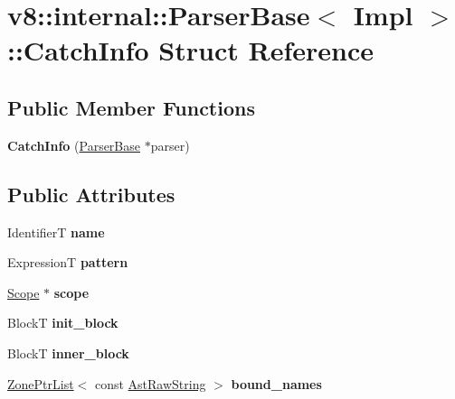\hypertarget{structv8_1_1internal_1_1ParserBase_1_1CatchInfo}{}\section{v8\+:\+:internal\+:\+:Parser\+Base$<$ Impl $>$\+:\+:Catch\+Info Struct Reference}
\label{structv8_1_1internal_1_1ParserBase_1_1CatchInfo}
\subsection*{Public Member Functions}
\begin{DoxyCompactItemize}
\item 
\mbox{\label{structv8_1_1internal_1_1ParserBase_1_1CatchInfo_afb8d993402582c10a5879d2c73afaebc}} 
{\bfseries Catch\+Info} (\mbox{\hyperlink{classv8_1_1internal_1_1ParserBase}{Parser\+Base}} $\ast$parser)
\end{DoxyCompactItemize}
\subsection*{Public Attributes}
\begin{DoxyCompactItemize}
\item 
\mbox{\label{structv8_1_1internal_1_1ParserBase_1_1CatchInfo_a7bf8d2ca51ca18cdbe1d92dfb7345d68}} 
IdentifierT {\bfseries name}
\item 
\mbox{\label{structv8_1_1internal_1_1ParserBase_1_1CatchInfo_aad4ae07c86da474233e3474970623a17}} 
ExpressionT {\bfseries pattern}
\item 
\mbox{\label{structv8_1_1internal_1_1ParserBase_1_1CatchInfo_a768916ef0babd2723b87390c60604dc1}} 
\mbox{\hyperlink{classv8_1_1internal_1_1Scope}{Scope}} $\ast$ {\bfseries scope}
\item 
\mbox{\label{structv8_1_1internal_1_1ParserBase_1_1CatchInfo_ad7573933e3ca68313493ca1d893b07b6}} 
BlockT {\bfseries init\+\_\+block}
\item 
\mbox{\label{structv8_1_1internal_1_1ParserBase_1_1CatchInfo_ad1605d157a6cb8d6ab8e13b22b721792}} 
BlockT {\bfseries inner\+\_\+block}
\item 
\mbox{\label{structv8_1_1internal_1_1ParserBase_1_1CatchInfo_a091abd7d722fb84ebffa4efd49ca3af3}} 
\mbox{\hyperlink{classv8_1_1internal_1_1ZoneList}{Zone\+Ptr\+List}}$<$ const \mbox{\hyperlink{classv8_1_1internal_1_1AstRawString}{Ast\+Raw\+String}} $>$ {\bfseries bound\+\_\+names}
\end{DoxyCompactItemize}



